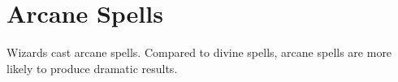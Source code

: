 \section{Arcane Spells}
Wizards cast arcane spells. Compared to divine spells, arcane spells are more likely to produce dramatic results.






